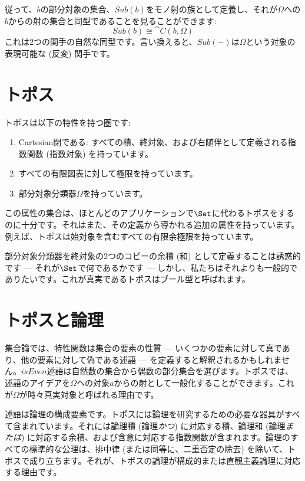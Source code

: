 従って、\(b\)の部分対象の集合、\(\mathit{Sub}(b)\)をモノ射の族として定義し、それが\(\Omega\)への\(b\)からの射の集合と同型であることを見ることができます: 
\[\mathit{Sub}(b) \cong \cat{C}(b, \Omega)\]
これは2つの関手の自然な同型です。言い換えると、\(\mathit{Sub}(-)\)は\(\Omega\)という対象の表現可能な (反変) 関手です。

\section{トポス}

トポスは以下の特性を持つ圏です: 

\begin{enumerate}
  \tightlist
  \item
        Cartesian閉である: すべての積、終対象、および右随伴として定義される指数関数 (指数対象) を持っています。
  \item
        すべての有限図表に対して極限を持っています。
  \item
        部分対象分類器\(\Omega\)を持っています。
\end{enumerate}

この属性の集合は、ほとんどのアプリケーションで\(\Set\)に代わるトポスをするのに十分です。それはまた、その定義から導かれる追加の属性を持っています。例えば、トポスは始対象を含むすべての有限余極限を持っています。

部分対象分類器を終対象の2つのコピーの余積 (和) として定義することは誘惑的です --- それが\(\Set\)で何であるかです --- しかし、私たちはそれよりも一般的でありたいです。これが真実であるトポスはブール型と呼ばれます。

\section{トポスと論理}

集合論では、特性関数は集合の要素の性質 --- いくつかの要素に対して真であり、他の要素に対して偽である述語 --- を定義すると解釈されるかもしれません。\(\mathit{isEven}\)述語は自然数の集合から偶数の部分集合を選びます。トポスでは、述語のアイデアを\(\Omega\)への対象\(a\)からの射として一般化することができます。これが\(\Omega\)が時々真実対象と呼ばれる理由です。

述語は論理の構成要素です。トポスには論理を研究するための必要な器具がすべて含まれています。それには論理積 (論理\emph{かつ}) に対応する積、論理和 (論理\emph{または}) に対応する余積、および含意に対応する指数関数が含まれます。論理のすべての標準的な公理は、排中律 (または同等に、二重否定の除去) を除いて、トポスで成り立ちます。それが、トポスの論理が構成的または直観主義論理に対応する理由です。

